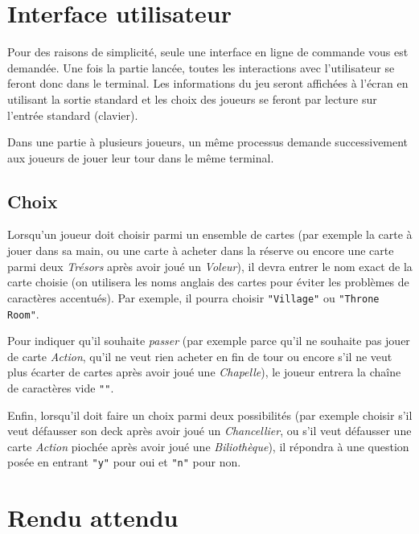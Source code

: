 \documentclass[12pt]{td}
\begin{document}

\section{Interface utilisateur}

Pour des raisons de simplicité, seule une interface en ligne de commande vous est demandée. Une fois la partie lancée, toutes les interactions avec l'utilisateur se feront donc dans le terminal. Les informations du jeu seront affichées à l'écran en utilisant la sortie standard et les choix des joueurs se feront par lecture sur l'entrée standard (clavier).

Dans une partie à plusieurs joueurs, un même processus demande successivement aux joueurs de jouer leur tour dans le même terminal.

\subsection{Choix}

Lorsqu'un joueur doit choisir parmi un ensemble de cartes (par exemple la carte à jouer dans sa main, ou une carte à acheter dans la réserve ou encore une carte parmi deux \emph{Trésors} après avoir joué un \emph{Voleur}), il devra entrer le nom exact de la carte choisie (on utilisera les noms anglais des cartes pour éviter les problèmes de caractères accentués). Par exemple, il pourra choisir \texttt{"Village"} ou \texttt{"Throne Room"}.

Pour indiquer qu'il souhaite \emph{passer} (par exemple parce qu'il ne souhaite pas jouer de carte \emph{Action}, qu'il ne veut rien acheter en fin de tour ou encore s'il ne veut plus écarter de cartes après avoir joué une \emph{Chapelle}), le joueur entrera la chaîne de caractères vide \texttt{""}.

Enfin, lorsqu'il doit faire un choix parmi deux possibilités (par exemple choisir s'il veut défausser son deck après avoir joué un \emph{Chancellier}, ou s'il veut défausser une carte \emph{Action} piochée après avoir joué une \emph{Biliothèque}), il répondra à une question posée en entrant \texttt{"y"} pour oui et \texttt{"n"} pour non.


\section{Rendu attendu}
\end{document}
